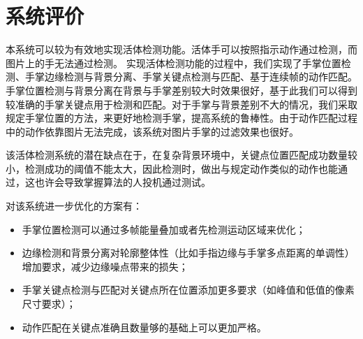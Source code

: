 \documentclass[UTF8, a4paper, fontset=none]{article}
\begin{document}
\section{系统评价}

本系统可以较为有效地实现活体检测功能。活体手可以按照指示动作通过检测，而图片上的手无法通过检测。
实现活体检测功能的过程中，我们实现了手掌位置检测、手掌边缘检测与背景分离、手掌关键点检测与匹配、基于连续帧的动作匹配。
手掌位置检测与背景分离在背景与手掌差别较大时效果很好，基于此我们可以得到较准确的手掌关键点用于检测和匹配。对于手掌与背景差别不大的情况，我们采取规定手掌位置的方法，来更好地检测手掌，提高系统的鲁棒性。由于动作匹配过程中的动作依靠图片无法完成，该系统对图片手掌的过滤效果也很好。

该活体检测系统的潜在缺点在于，在复杂背景环境中，关键点位置匹配成功数量较小，检测成功的阈值不能太大，因此检测时，做出与规定动作类似的动作也能通过，这也许会导致掌握算法的人投机通过测试。

对该系统进一步优化的方案有：
\begin{itemize}
  \item 手掌位置检测可以通过多帧能量叠加或者先检测运动区域来优化；
  \item 边缘检测和背景分离对轮廓整体性（比如手指边缘与手掌多点距离的单调性）增加要求，减少边缘噪点带来的损失；
  \item 手掌关键点检测与匹配对关键点所在位置添加更多要求（如峰值和低值的像素尺寸要求）；
  \item 动作匹配在关键点准确且数量够的基础上可以更加严格。
\end{itemize}
\end{document}
